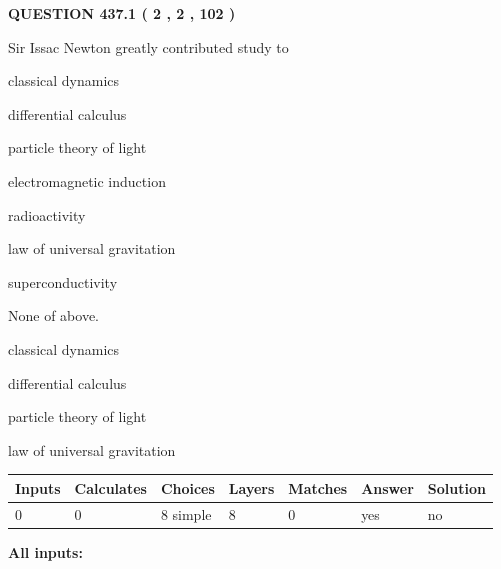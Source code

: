 \documentclass[12pt]{article}
\begin{document}
{\textbf{\Large{QUESTION
437.1 
 ( 2 , 2 , 102 )
}}}
  
  
Sir Issac Newton greatly contributed study to
 
 
classical dynamics
 
 
differential calculus
 
 
particle theory of light
 
 
electromagnetic induction
 
 
radioactivity
 
 
law of universal gravitation
 
 
superconductivity
 
 
 None of above.
 
 
\noindent{}
 
 
classical dynamics
 
 
differential calculus
 
 
particle theory of light
 
 
law of universal gravitation
 
 
\noindent{}
 
 
   
   
   
   
\noindent\begin{tabular}{|l|l|l|l|l|l|l|}
 \hline
Inputs & Calculates & Choices & Layers & Matches & Answer & Solution \\ \hline
 0  & 
 0  & 
 8
  simple  
  & 
 8  & 
 0  & 
  yes & 
  no 
  \\ \hline
 \end{tabular}
   
   
   
   
\noindent{}
   
   
   
   
\noindent\vspace{0.1in}\hspace{-0.08in} {\textbf{\Large{All inputs: }}}
   
\end{document}
